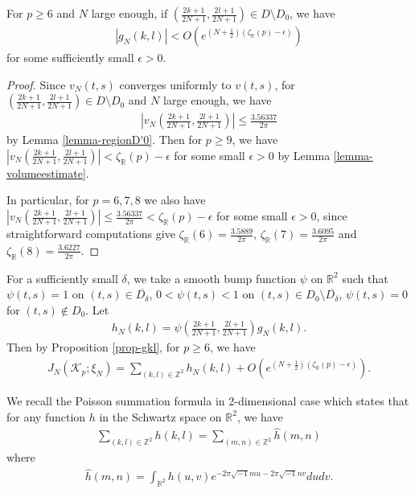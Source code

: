 \documentclass[12pt]{amsart}
\begin{document}
\begin{proposition} \label{prop-gkl}
For $p\geq 6$ and $N$ large enough, if  $(\frac{2k+1}{2N+1},\frac{2l+1}{2N+1})\in D\setminus D_0$,  we have
\begin{align}
    |g_{N}(k,l)|<O\left(e^{(N+\frac{1}{2})\left(\zeta_{\mathbb{R}}(p)-\epsilon\right)}\right)
\end{align}
for some sufficiently small $\epsilon>0$.
\end{proposition}
\begin{proof}
 Since $v_{N}(t,s)$ converges uniformly to $v(t,s)$, for $(\frac{2k+1}{2N+1},\frac{2l+1}{2N+1})\in D\setminus D_0$ and $N$ large enough, we have
\begin{align} \label{formula-gkl}
    |v_N\left(\frac{2k+1}{2N+1},\frac{2l+1}{2N+1}\right)|\leq \frac{3.56337}{2\pi}
    \end{align}
    by Lemma \ref{lemma-regionD'0}.
Then for $p\geq 9$, we have
  $
    |v_N\left(\frac{2k+1}{2N+1},\frac{2l+1}{2N+1}\right)| <\zeta_{\mathbb{R}}(p)-\epsilon
$
    for some small $\epsilon>0$ by Lemma \ref{lemma-volumeestimate}. 
    
In particular, for $p=6,7,8$ we also have 
$|v_N\left(\frac{2k+1}{2N+1},\frac{2l+1}{2N+1}\right)|\leq \frac{3.56337}{2\pi}<\zeta_{\mathbb{R}}(p)-\epsilon$
    for some small $\epsilon>0$, since straightforward computations give $\zeta_{\mathbb{R}}(6)=\frac{3.5889}{2\pi }$, $\zeta_{\mathbb{R}}(7)=\frac{3.6095}{2\pi }$ and $\zeta_{\mathbb{R}}(8)=\frac{3.6227}{2\pi }$. 
\end{proof}


For a sufficiently small $\delta$, we take a smooth bump function $\psi$ on $\mathbb{R}^2$ such that
$\psi(t,s)=1$ on $(t,s)\in \overline{D_{\delta}}$,  $0<\psi(t,s)<1$ on $(t,s)\in D_0\setminus \overline{D_{\delta}}$, $\psi(t,s)=0$ for $(t,s)\notin D_0$.  
Let 
\begin{align}
    h_N(k,l)=\psi\left(\frac{2k+1}{2N+1},\frac{2l+1}{2N+1}\right)g_N(k,l).
\end{align}
Then  by Proposition \ref{prop-gkl},  for $p\geq 6$, we have 
\begin{align}  \label{formula-JN}
    J_N(\mathcal{K}_p;\xi_N)=\sum_{(k,l)\in \mathbb{Z}^2}h_N(k,l)+O\left(e^{(N+\frac{1}{2})\left(\zeta_{\mathbb{R}}(p)-\epsilon\right)}\right).
\end{align}

  We recall the Poisson summation formula \cite{SS03} in 2-dimensional case which states that for any function $h$ in the Schwartz space on $\mathbb{R}^2$, we have 
\begin{align} \label{formula-Poisson}
    \sum_{(k,l)\in \mathbb{Z}^2}h(k,l)=\sum_{(m,n)\in \mathbb{Z}^2}\hat{h}(m,n)
\end{align}
where 
\begin{align}
    \hat{h}(m,n)=\int_{\mathbb{R}^2}h(u,v)e^{-2\pi \sqrt{-1}mu-2\pi \sqrt{-1}nv}dudv.
\end{align}
\end{document}
